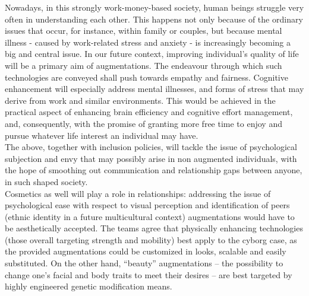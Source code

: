 Nowadays, in this strongly work-money-based society, human beings struggle very often in understanding each other. This happens not only because of the ordinary issues that occur, for instance, within family or couples, but because mental illness - caused by work-related stress and anxiety -  is increasingly becoming a big and central issue. In our future context, improving individual’s quality of life will be a primary aim of augmentations. The endeavour through which such technologies are conveyed shall push towards empathy and fairness. Cognitive enhancement will especially address mental illnesses, and forms of stress that may derive from work and similar environments. This would be achieved in the practical aspect of enhancing brain efficiency and cognitive effort management, and, consequently, with the promise of granting more free time to enjoy and pursue whatever life interest an individual may have.\\

The above, together with inclusion policies, will tackle the issue of psychological subjection and envy that may possibly arise in non augmented individuals, with the hope of smoothing out communication and relationship gaps between anyone, in such shaped society.\\

Cosmetics as well will play a role in relationships: addressing the issue of psychological ease with respect to visual perception and identification of peers (ethnic identity in a future multicultural context) augmentations would have to be aesthetically accepted. The teams agree that physically enhancing technologies (those overall targeting strength and mobility) best apply to the cyborg case, as the provided augmentations could be customized in looks, scalable and easily substituted. On the other hand, “beauty” augmentations – the possibility to change one’s facial and body traits to meet their desires – are best targeted by highly engineered genetic modification means.
